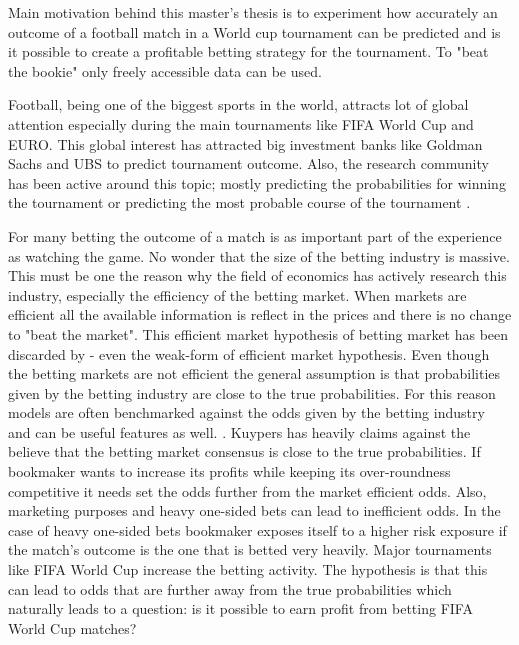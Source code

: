 Main motivation behind this master's thesis is to experiment how accurately an outcome of a football match in a World cup tournament can be predicted and is it possible to create a profitable betting strategy for the tournament. To "beat the bookie" only freely accessible data can be used.

Football, being one of the biggest sports in the world, attracts lot of global attention especially during the main tournaments like FIFA World Cup and EURO. This global interest has attracted big investment banks like Goldman Sachs and UBS to predict tournament outcome. Also, the research community has been active around this topic; mostly predicting the probabilities for winning the tournament or predicting the most probable course of the tournament \cite{groll2018prediction, groll2015prediction, leitner2010forecasting}.

For many betting the outcome of a match is as important part of the experience as watching the game. No wonder that the size of the betting industry is massive. This must be one the reason why the field of economics has actively research this industry, especially the efficiency of the betting market. When markets are efficient all the available information is reflect in the prices and there is no change to "beat the market". This efficient market hypothesis of betting market has been discarded by \cite{vlastakis2009efficient} - even the weak-form of efficient market hypothesis. Even though the betting markets are not efficient the general assumption is that probabilities given by the betting industry are close to the true probabilities. For this reason models are often benchmarked against the odds given by the betting industry and can be useful features as well. \cite{leitner2010forecasting}. Kuypers \cite{kuypers2008} has heavily claims against the believe that the betting market consensus is close to the true probabilities. If bookmaker wants to increase its profits while keeping its over-roundness competitive it needs set the odds further from the market efficient odds. Also, marketing purposes and heavy one-sided bets can lead to inefficient odds. In the case of heavy one-sided bets bookmaker exposes itself to a higher risk exposure if the match's outcome is the one that is betted very heavily. Major tournaments like FIFA World Cup increase the betting activity. The hypothesis is that this can lead to odds that are further away from the true probabilities which naturally leads to a question: is it possible to earn profit from betting FIFA World Cup matches?

